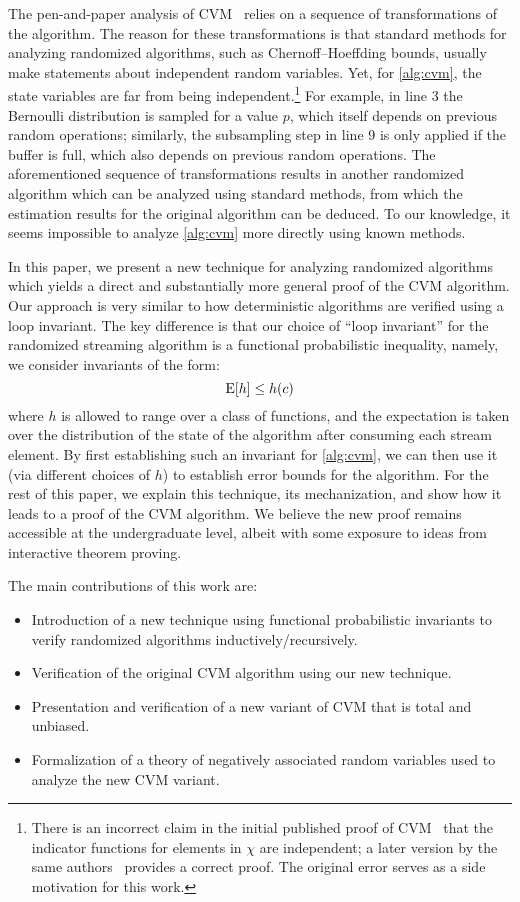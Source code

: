 The pen-and-paper analysis of CVM~\cite{chakraborty2022,chakraborty2023} relies on a sequence of transformations of the algorithm.
The reason for these transformations is that standard methods for analyzing randomized algorithms, such as Chernoff--Hoeffding bounds, usually make statements about independent random variables.
Yet, for \cref{alg:cvm}, the state variables are far from being independent.\footnote{There is an incorrect claim in the initial published proof of CVM~\cite[Claim 6]{chakraborty2022} that the indicator functions for elements in $\chi$ are independent; a later version by the same authors~\cite{chakraborty2023} provides a correct proof.
The original error serves as a side motivation for this work.}
For example, in line 3 the Bernoulli distribution is sampled for a value $p$, which itself depends on previous random operations; similarly, the subsampling step in line 9 is only applied if the buffer is full, which also depends on previous random operations.
The aforementioned sequence of transformations results in another randomized algorithm which can be analyzed using standard methods, from which the estimation results for the original algorithm can be deduced.
To our knowledge, it seems impossible to analyze \cref{alg:cvm} more directly using known methods.

In this paper, we present a new technique for analyzing randomized algorithms which yields a direct and substantially more general proof of the CVM algorithm.
Our approach is very similar to how deterministic algorithms are verified using a loop invariant.
The key difference is that our choice of ``loop invariant'' for the randomized streaming algorithm is a functional probabilistic inequality, namely, we consider invariants of the form:
\[
  \operatorname{\mathrm{E}} [ h ] \leq h(c)
\]
where $h$ is allowed to range over a class of functions, and the expectation is taken over the distribution of the state of the algorithm after consuming each stream element.
By first establishing such an invariant for \cref{alg:cvm}, we can then use it (via different choices of $h$) to establish error bounds for the algorithm.
For the rest of this paper, we explain this technique, its mechanization, and show how it leads to a proof of the CVM algorithm.
We believe the new proof remains accessible at the undergraduate level, albeit with some exposure to ideas from interactive theorem proving.

The main contributions of this work are:
\begin{itemize}
\item Introduction of a new technique using functional probabilistic invariants to verify randomized algorithms inductively/recursively.
\item Verification of the original CVM algorithm using our new technique.
\item Presentation and verification of a new variant of CVM that is total and unbiased.
\item Formalization of a theory of negatively associated random variables used to analyze the new CVM variant.
\end{itemize}

